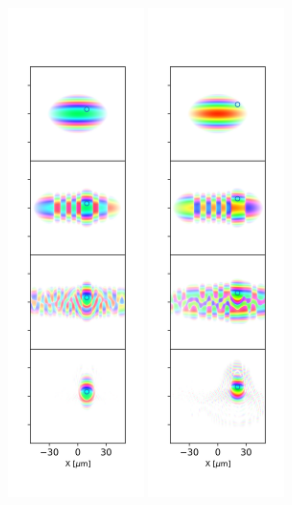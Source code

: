 \documentclass{iucr}              %
\begin{document}
\begin{figure}
\includegraphics[width=0.32\textwidth]{Figures/vx_id16a_B.png}
\includegraphics[width=0.32\textwidth]{Figures/vx_id16a_C.png}

\end{figure}
\end{document}
